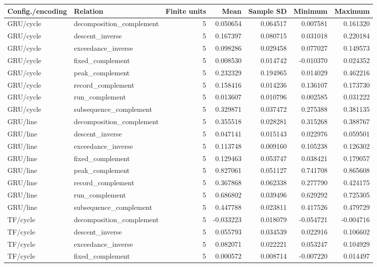 \begin{table}[p]\centering\scriptsize
\begin{tabular}{llrrrrr}\toprule
Config./encoding & Relation & Finite units & Mean & Sample SD & Minimum & Maximum\\\midrule
GRU/cycle & decomposition\_complement & 5 & 0.050654 & 0.064517 & 0.007581 & 0.161320\\
GRU/cycle & descent\_inverse & 5 & 0.167397 & 0.080715 & 0.031018 & 0.220184\\
GRU/cycle & exceedance\_inverse & 5 & 0.098286 & 0.029458 & 0.077027 & 0.149573\\
GRU/cycle & fixed\_complement & 5 & 0.008530 & 0.014742 & -0.010370 & 0.024352\\
GRU/cycle & peak\_complement & 5 & 0.232329 & 0.194965 & 0.014029 & 0.462216\\
GRU/cycle & record\_complement & 5 & 0.158416 & 0.014236 & 0.136107 & 0.173730\\
GRU/cycle & run\_complement & 5 & 0.013607 & 0.010796 & 0.002585 & 0.031222\\
GRU/cycle & subsequence\_complement & 5 & 0.329871 & 0.037472 & 0.275388 & 0.381135\\
GRU/line & decomposition\_complement & 5 & 0.355518 & 0.028281 & 0.315268 & 0.388767\\
GRU/line & descent\_inverse & 5 & 0.047141 & 0.015143 & 0.022976 & 0.059501\\
GRU/line & exceedance\_inverse & 5 & 0.113748 & 0.009160 & 0.105238 & 0.126302\\
GRU/line & fixed\_complement & 5 & 0.129463 & 0.053747 & 0.038421 & 0.179057\\
GRU/line & peak\_complement & 5 & 0.827061 & 0.051127 & 0.741708 & 0.865608\\
GRU/line & record\_complement & 5 & 0.367868 & 0.062338 & 0.277790 & 0.424175\\
GRU/line & run\_complement & 5 & 0.686802 & 0.039496 & 0.629292 & 0.725305\\
GRU/line & subsequence\_complement & 5 & 0.447788 & 0.023811 & 0.417526 & 0.479729\\
TF/cycle & decomposition\_complement & 5 & -0.033223 & 0.018079 & -0.054721 & -0.004716\\
TF/cycle & descent\_inverse & 5 & 0.055793 & 0.034539 & 0.022916 & 0.106602\\
TF/cycle & exceedance\_inverse & 5 & 0.082071 & 0.022221 & 0.053247 & 0.104929\\
TF/cycle & fixed\_complement & 5 & 0.000572 & 0.008714 & -0.007220 & 0.014497\\

\end{tabular}
\end{table}
